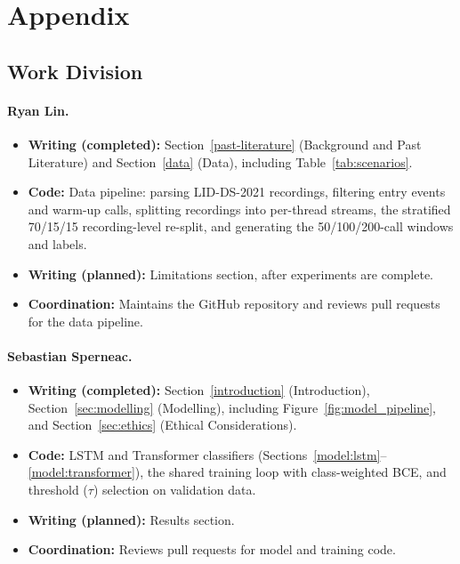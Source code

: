 \documentclass{article}
\begin{document}


\section{Appendix}
    \subsection{Work Division}

    \paragraph{Ryan Lin.}
    \begin{itemize}
        \item \textbf{Writing (completed):} Section~\ref{past-literature} (Background and Past Literature) and Section~\ref{data} (Data), including Table~\ref{tab:scenarios}.
        \item \textbf{Code:} Data pipeline: parsing LID-DS-2021 recordings, filtering entry events and warm-up calls, splitting recordings into per-thread streams, the stratified 70/15/15 recording-level re-split, and generating the 50/100/200-call windows and labels.
        \item \textbf{Writing (planned):} Limitations section, after experiments are complete.
        \item \textbf{Coordination:} Maintains the GitHub repository and reviews pull requests for the data pipeline.
    \end{itemize}
    
    \paragraph{Sebastian Sperneac.}
    \begin{itemize}
        \item \textbf{Writing (completed):} Section~\ref{introduction} (Introduction), Section~\ref{sec:modelling} (Modelling), including Figure~\ref{fig:model_pipeline}, and Section~\ref{sec:ethics} (Ethical Considerations).
        \item \textbf{Code:} LSTM and Transformer classifiers (Sections~\ref{model:lstm}--\ref{model:transformer}), the shared training loop with class-weighted BCE, and threshold ($\tau$) selection on validation data.
        \item \textbf{Writing (planned):} Results section.
        \item \textbf{Coordination:} Reviews pull requests for model and training code.
    \end{itemize}
    
\end{document}
